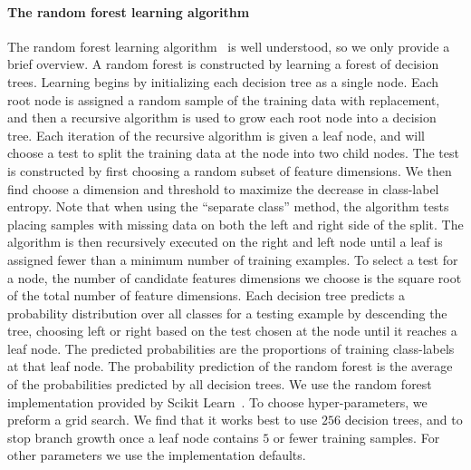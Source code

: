     \paragraph{The random forest learning algorithm}
    The random forest learning algorithm~\cite{breiman_random_2001} is well understood, so we only provide a
      brief overview.
    A random forest is constructed by learning a forest of decision trees.
    Learning begins by initializing each decision tree as a single node.
    Each root node is assigned a random sample of the training data with replacement, and then a recursive
      algorithm is used to grow each root node into a decision tree.
    Each iteration of the recursive algorithm is given a leaf node, and will choose a test to split the training
      data at the node into two child nodes.
    The test is constructed by first choosing a random subset of feature dimensions.
    We then find choose a dimension and threshold to maximize the decrease in class-label entropy.
    Note that when using the ``separate class'' method, the algorithm tests placing samples with missing data on
      both the left and right side of the split.
    The algorithm is then recursively executed on the right and left node until a leaf is assigned fewer than a
      minimum number of training examples.
    To select a test for a node, the number of candidate features dimensions we choose is the square root of the
      total number of feature dimensions.
    Each decision tree predicts a probability distribution over all classes for a testing example by descending
      the tree, choosing left or right based on the test chosen at the node until it reaches a leaf node.
    The predicted probabilities are the proportions of training class-labels at that leaf node.
    The probability prediction of the random forest is the average of the probabilities predicted by all decision
      trees.
    We use the random forest implementation provided by Scikit Learn~\cite{pedregosa_scikit_learn_2011}.
    To choose hyper-parameters, we preform a grid search.
    We find that it works best to use $256$ decision trees, and to stop branch growth once a leaf node contains
      $5$ or fewer training samples.
    For other parameters we use the implementation defaults.

